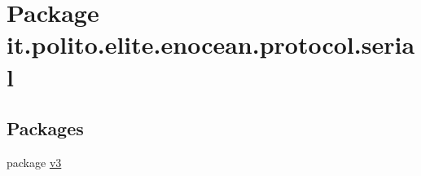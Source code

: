 \hypertarget{namespaceit_1_1polito_1_1elite_1_1enocean_1_1protocol_1_1serial}{}\section{Package it.\+polito.\+elite.\+enocean.\+protocol.\+serial}
\label{namespaceit_1_1polito_1_1elite_1_1enocean_1_1protocol_1_1serial}
\subsection*{Packages}
\begin{DoxyCompactItemize}
\item 
package \hyperlink{namespaceit_1_1polito_1_1elite_1_1enocean_1_1protocol_1_1serial_1_1v3}{v3}
\end{DoxyCompactItemize}
